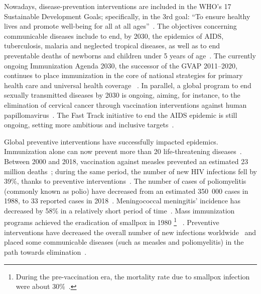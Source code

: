Nowadays, disease-prevention interventions are included in the WHO's 17 Sustainable Development Goals; specifically, in the 3rd goal: ``To ensure healthy lives and promote well-being for all at all ages''~\cite[]{SDG_Goal3}. The objectives concerning communicable diseases include to end, by 2030, the epidemics of AIDS, tuberculosis, malaria and neglected tropical diseases, as well as to end preventable deaths of newborns and children under 5 years of age~\cite[]{SDG_Goal3}. The currently ongoing Immunization Agenda 2030, the successor of the GVAP 2011--2020, continues to place immunization in the core of national strategies for primary health care and universal health coverage~ \cite[]{WHO_IA2030}. In parallel, a global program to end sexually transmitted diseases by 2030 is ongoing, aiming, for instance, to the elimination of cervical cancer through vaccination interventions against human papillomavirus~\cite[]{WHO_STIs}. The Fast Track initiative to end the AIDS
epidemic is still ongoing, setting more ambitious and inclusive targets~\cite[]{UNAIDS_EndAIDS2030}. 

Global preventive interventions have successfully impacted epidemics. Immunization alone can now prevent more than 20 life-threatening diseases~\cite[]{WHO_IA2030}. Between 2000 and 2018, vaccination against measles prevented an estimated 23 million deaths~\cite[]{WHO_Factsheet_Measles}; during the same period, the number of new HIV infections fell by 39\%, thanks to preventive interventions~\cite[]{WHO_Factsheet_HIV}. The number of cases of poliomyelitis %
(commonly known as polio) have decreased from an estimated 350~000 cases in 1988, to 33 reported cases in 2018~\cite[]{WHO_Factsheet_Polio}. Meningococcal meningitis' %
incidence has decreased by 58\% in a relatively short period of time~\cite[]{WHO_Factsheet_Meningitis}. Mass immunization programs achieved the eradication of smallpox in 1980%
\footnote{During the pre-vaccination era, the mortality rate due to smallpox infection were about 30\%~\cite[]{CDC_Smallpox2001}.}
~\cite[]{CDC_Smallpox2001}. Preventive interventions have decreased the overall number of new infections worldwide~\cite[]{CDC_10achievements} and placed some communicable diseases (such as measles and poliomyelitis) in the path towards elimination~\cite[]{CDC_10achievements}. 


